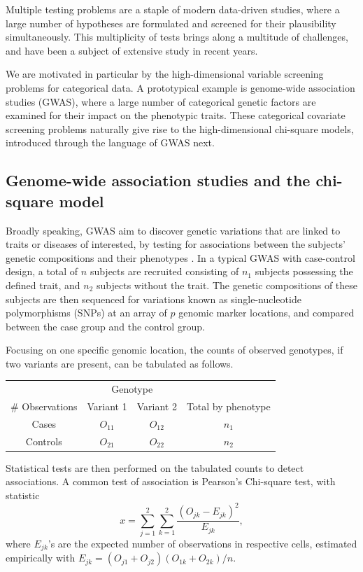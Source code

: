 
Multiple testing problems are a staple of modern data-driven studies, where a large number of hypotheses are formulated and screened for their plausibility simultaneously.
This multiplicity of tests brings along a multitude of challenges, and have been a subject of extensive study in recent years.


We are motivated in particular by the high-dimensional variable screening problems for categorical data. 
A prototypical example is genome-wide association studies (GWAS), where a large number of categorical genetic factors are examined for their impact on the phenotypic traits.
These categorical covariate screening problems naturally give rise to the high-dimensional chi-square models, introduced through the language of GWAS next.

\subsection{Genome-wide association studies and the chi-square model}
\label{subsec:motivation-chisq}

Broadly speaking, GWAS aim to discover genetic variations that are linked to traits or diseases of interested, by testing for associations between the subjects' genetic compositions and their phenotypes \citep{bush2012genome}.
In a typical GWAS with case-control design, a total of $n$ subjects are recruited consisting of $n_1$ subjects possessing the defined trait, and $n_2$ subjects without the trait.
The genetic compositions of these subjects are then sequenced for variations known as single-nucleotide polymorphisms (SNPs) at an array of $p$ genomic marker locations, and compared between the case group and the control group.

Focusing on one specific genomic location, the counts of observed genotypes, if two variants are present, can be tabulated as follows.
\begin{center}
    \begin{tabular}{cccc}
    \hline
    & \multicolumn{2}{c}{Genotype} & \\
    \cline{2-3}
    \# Observations & Variant 1 & Variant 2 & Total by phenotype \\
    \hline
    Cases & $O_{11}$ & $O_{12}$ & $n_1$ \\
    Controls & $O_{21}$ & $O_{22}$ & $n_2$ \\
    \hline
    \end{tabular}
\end{center}
Statistical tests are then performed on the tabulated counts to detect associations.
A common test of association is Pearson's Chi-square test, with statistic
\begin{equation} \label{eq:chisq-statistic}
    x = \sum_{j=1}^2 \sum_{k=1}^2 \frac{(O_{jk} - E_{jk})^2}{E_{jk}},
\end{equation}
where $E_{jk}$'s are the expected number of observations in respective cells, estimated empirically with $E_{jk} = (O_{j1}+O_{j2})(O_{1k}+O_{2k})/n$.

